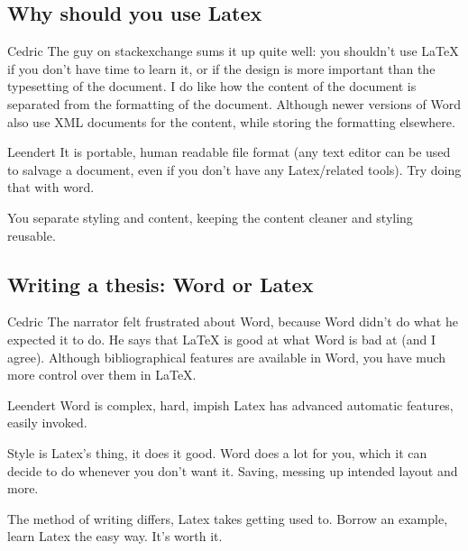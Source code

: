 \subsection{Why should you use Latex}

\begin{cquote}{Cedric}
The guy on stackexchange sums it up quite well: you shouldn't use LaTeX if you don't have time to learn it, or if the design is more important than the typesetting of the document. I do like how the content of the document is separated from the formatting of the document. Although newer versions of Word also use XML documents for the content, while storing the formatting elsewhere.
\end{cquote}


\begin{cquote}{Leendert}
It is portable, human readable file format (any text editor can be used to salvage a document, even if you don't have any Latex/related tools). Try doing that with word.

\vspace{10pt}
You separate styling and content, keeping the content cleaner and styling reusable.
\end{cquote}

\subsection{Writing a thesis: Word or Latex}

\begin{cquote}{Cedric}
The narrator felt frustrated about Word, because Word didn't do what he expected it to do. He says that LaTeX is good at what Word is bad at (and I agree). Although bibliographical features are available in Word, you have much more control over them in LaTeX.
\end{cquote}

\begin{cquote}{Leendert}
Word is complex, hard, impish Latex has advanced automatic features, easily invoked.

\vspace{10pt}
Style is Latex's thing, it does it good. Word does a lot for you, which it can decide to do whenever you don't want it. Saving, messing up intended layout and more.

\vspace{10pt}
The method of writing differs, Latex takes getting used to. Borrow an example, learn Latex the easy way. It's worth it.
\end{cquote}

